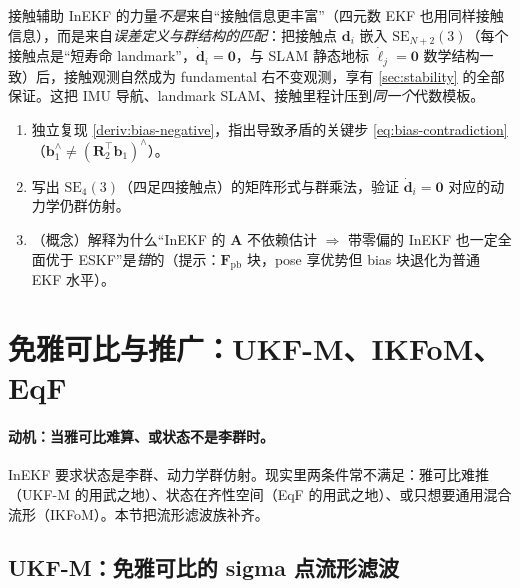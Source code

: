 \begin{insight}
接触辅助 InEKF 的力量\emph{不是}来自“接触信息更丰富”（四元数 EKF 也用同样接触信息），而是来自\emph{误差定义与群结构的匹配}：把接触点 $\mathbf{d}_i$ 嵌入 $\mathrm{SE}_{N+2}(3)$（每个接触点是“短寿命 landmark”，$\dot{\mathbf{d}}_i=\mathbf{0}$，与 SLAM 静态地标 $\dot{\boldsymbol{\ell}}_j=\mathbf{0}$ 数学结构一致）后，接触观测自然成为 fundamental 右不变观测，享有 \cref{sec:stability} 的全部保证。这把 IMU 导航、landmark SLAM、接触里程计压到\emph{同一个}代数模板。
\end{insight}

\begin{practice}
\begin{enumerate}
  \item 独立复现 \cref{deriv:bias-negative}，指出导致矛盾的关键步 \cref{eq:bias-contradiction}（$\mathbf{b}_1^\wedge\neq(\mathbf{R}_2^\top\mathbf{b}_1)^\wedge$）。
  \item 写出 $\mathrm{SE}_4(3)$（四足四接触点）的矩阵形式与群乘法，验证 $\dot{\mathbf{d}}_i=\mathbf{0}$ 对应的动力学仍群仿射。
  \item （概念）解释为什么“InEKF 的 $\mathbf{A}$ 不依赖估计 $\Rightarrow$ 带零偏的 InEKF 也一定全面优于 ESKF”是\emph{错}的（提示：$\mathbf{F}_{\mathrm{pb}}$ 块，pose 享优势但 bias 块退化为普通 EKF 水平）。
\end{enumerate}
\end{practice}

\section{免雅可比与推广：UKF-M、IKFoM、EqF}
\label{sec:ukfm-ikfom}

\paragraph{动机：当雅可比难算、或状态不是李群时。}
InEKF 要求状态是李群、动力学群仿射。现实里两条件常不满足：雅可比难推（UKF-M 的用武之地）、状态在齐性空间（EqF 的用武之地）、或只想要通用混合流形（IKFoM）。本节把流形滤波族补齐。

\subsection{UKF-M：免雅可比的 sigma 点流形滤波}
\label{subsec:ukfm}


